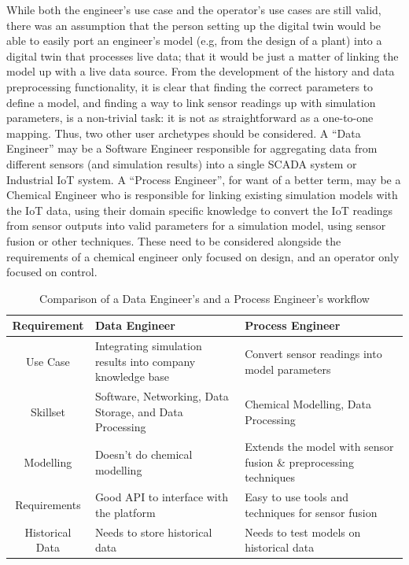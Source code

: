While both the engineer's use case and the operator's use cases are still valid, there was an assumption that the person setting up the digital twin would be able to easily port an engineer's model (e.g, from the design of a plant) into a digital twin that processes live data; that it would be just a matter of linking the model up with a live data source. 
From the development of the history and data preprocessing functionality, it is clear that finding the correct parameters to define a model, and finding a way to link sensor readings up with simulation parameters, is a non-trivial task: it is not as straightforward as a one-to-one mapping. 
Thus, two other user archetypes should be considered. A ``Data Engineer'' may be a Software Engineer responsible for aggregating data from different sensors (and simulation results) into a single SCADA system or Industrial IoT system. 
A ``Process Engineer'', for want of a better term, may be a Chemical Engineer who is responsible for linking existing simulation models with the IoT data, using their domain specific knowledge to convert the IoT readings from sensor outputs into valid parameters for a simulation model, using sensor fusion or other techniques. 
These need to be considered alongside the requirements of a chemical engineer only focused on design, and an operator only focused on control.

\begin{table}[ht]
    \centering
    \caption{Comparison of a Data Engineer's and a Process Engineer's workflow}
    \begin{tabular}{|c|p{}|p{}|}
        \hline
        \textbf{Requirement} & \textbf{Data Engineer} & \textbf{Process Engineer} \\
        \hline
        Use Case & Integrating simulation results into company knowledge base & Convert sensor readings into model parameters \\
        \hline
        Skillset & Software, Networking, Data Storage, and Data Processing  & Chemical Modelling, Data Processing \\
        \hline
        Modelling & Doesn't do chemical modelling & Extends the model with sensor fusion \& preprocessing techniques\\
        \hline
        Requirements & Good API to interface with the platform & Easy to use tools and techniques for sensor fusion \\
        \hline
        Historical Data & Needs to store historical data & Needs to test models on historical data \\
        \hline
    \end{tabular}
    \label{tab:morerequirements}
\end{table}


